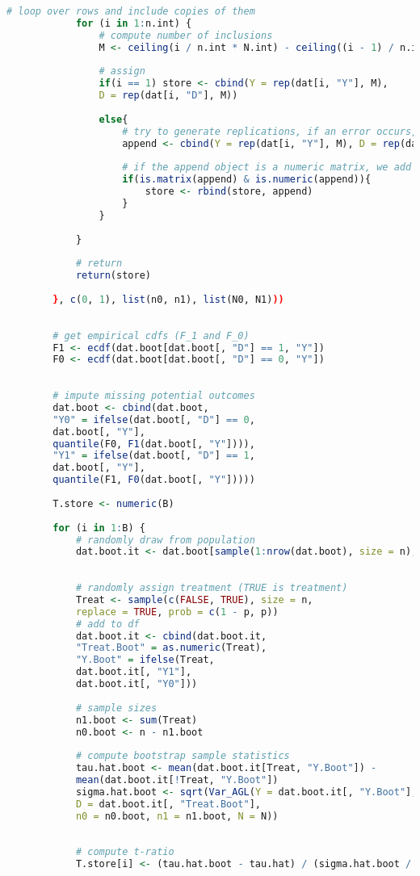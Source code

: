 \documentclass[aodsor,preprint]{imsart}
\numberwithin{equation}{section}
\theoremstyle{plain}
\begin{document}
\begin{lstlisting}[language=R, basicstyle=\tiny]
			# loop over rows and include copies of them
			for (i in 1:n.int) {
				# compute number of inclusions
				M <- ceiling(i / n.int * N.int) - ceiling((i - 1) / n.int * N.int)
				
				# assign
				if(i == 1) store <- cbind(Y = rep(dat[i, "Y"], M),
				D = rep(dat[i, "D"], M))
				
				else{
					# try to generate replications, if an error occurs, we simply skip this one
					append <- cbind(Y = rep(dat[i, "Y"], M), D = rep(dat[i, "D"], M))
					
					# if the append object is a numeric matrix, we add it to the store object
					if(is.matrix(append) & is.numeric(append)){
						store <- rbind(store, append)
					} 
				}
				
			}
			
			# return
			return(store)
			
		}, c(0, 1), list(n0, n1), list(N0, N1)))
		
		
		# get empirical cdfs (F_1 and F_0)
		F1 <- ecdf(dat.boot[dat.boot[, "D"] == 1, "Y"])
		F0 <- ecdf(dat.boot[dat.boot[, "D"] == 0, "Y"])
		
		
		# impute missing potential outcomes
		dat.boot <- cbind(dat.boot,
		"Y0" = ifelse(dat.boot[, "D"] == 0,
		dat.boot[, "Y"],
		quantile(F0, F1(dat.boot[, "Y"]))), 
		"Y1" = ifelse(dat.boot[, "D"] == 1,
		dat.boot[, "Y"],
		quantile(F1, F0(dat.boot[, "Y"]))))
		
		T.store <- numeric(B)
		
		for (i in 1:B) {
			# randomly draw from population
			dat.boot.it <- dat.boot[sample(1:nrow(dat.boot), size = n), ]
			
			
			# randomly assign treatment (TRUE is treatment)
			Treat <- sample(c(FALSE, TRUE), size = n,
			replace = TRUE, prob = c(1 - p, p))
			# add to df
			dat.boot.it <- cbind(dat.boot.it,
			"Treat.Boot" = as.numeric(Treat),
			"Y.Boot" = ifelse(Treat,
			dat.boot.it[, "Y1"],
			dat.boot.it[, "Y0"]))
			
			# sample sizes
			n1.boot <- sum(Treat)
			n0.boot <- n - n1.boot
			
			# compute bootstrap sample statistics
			tau.hat.boot <- mean(dat.boot.it[Treat, "Y.Boot"]) - 
			mean(dat.boot.it[!Treat, "Y.Boot"])
			sigma.hat.boot <- sqrt(Var_AGL(Y = dat.boot.it[, "Y.Boot"],
			D = dat.boot.it[, "Treat.Boot"],
			n0 = n0.boot, n1 = n1.boot, N = N))
			
			
			# compute t-ratio
			T.store[i] <- (tau.hat.boot - tau.hat) / (sigma.hat.boot / sqrt(n))
			

\end{lstlisting}
\end{document}
